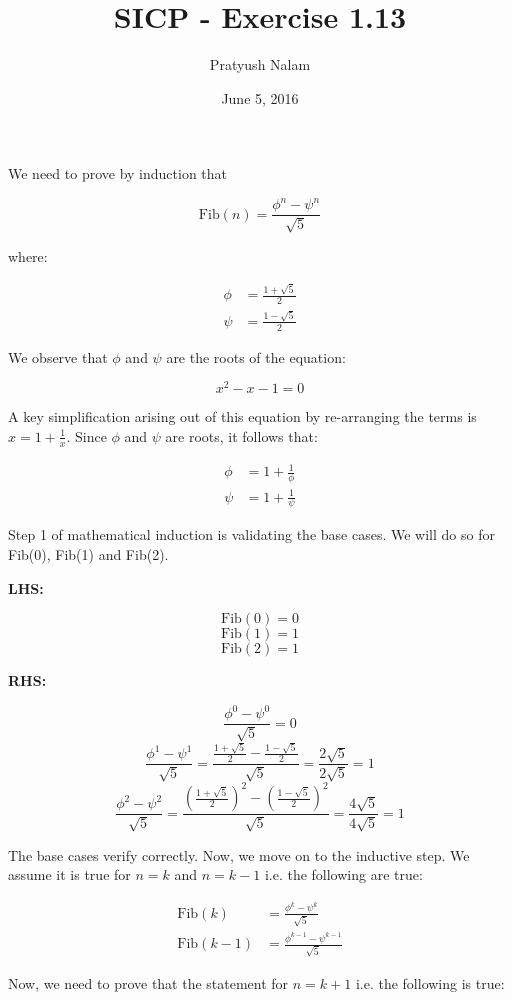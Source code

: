 \documentclass[a4paper]{article}
\title{SICP - Exercise 1.13}
\author{Pratyush Nalam}
\date{June 5, 2016}
\begin{document}
	\maketitle
	
	We need to prove by induction that
	
	\[
	\text{Fib}(n)=\frac{\phi^n-\psi^n}{\sqrt{5}}
	\]
	
	where:
	
	\[
	\begin{split}
	\phi&=\frac{1+\sqrt{5}}{2}\\	
	\psi&=\frac{1-\sqrt{5}}{2}
	\end{split}
	\]
	
	We observe that $\phi$ and $\psi$ are the roots of the equation: 
	
	\[x^2-x-1=0\]
	
	A key simplification arising out of this equation by re-arranging the terms is $x=1+\frac{1}{x}$. Since $\phi$ and $\psi$ are roots, it follows that:
	
	\[
	\begin{split}
	\phi&=1+\frac{1}{\phi}\\	
	\psi&=1+\frac{1}{\psi}
	\end{split}
	\]
	
	Step 1 of mathematical induction is validating the base cases. We will do so for Fib(0), Fib(1) and Fib(2).
	
	\textbf{LHS:}
	
	\[\text{Fib}(0)=0\]
	\[\text{Fib}(1)=1\]
	\[\text{Fib}(2)=1\]
	
	\textbf{RHS:}
	
	\[\frac{\phi^0-\psi^0}{\sqrt{5}}=0\]
	\[\frac{\phi^1-\psi^1}{\sqrt{5}}=\frac{\frac{1+\sqrt{5}}{2}-\frac{1-\sqrt{5}}{2}}{\sqrt{5}}=\frac{2\sqrt{5}}{2\sqrt{5}}=1\]
	\[\frac{\phi^2-\psi^2}{\sqrt{5}}=\frac{\left(\frac{1+\sqrt{5}}{2}\right)^2-\left(\frac{1-\sqrt{5}}{2}\right)^2}{\sqrt{5}}=\frac{4\sqrt{5}}{4\sqrt{5}}=1\]
	
	The base cases verify correctly. Now, we move on to the inductive step. We assume it is true for $n=k$ and $n=k-1$ i.e. the following are true:
	
	\[
	\begin{split}
	\text{Fib}(k)&=\frac{\phi^k-\psi^k}{\sqrt{5}}\\
	\text{Fib}(k-1)&=\frac{\phi^{k-1}-\psi^{k-1}}{\sqrt{5}}
	\end{split}
	\]
	
	Now, we need to prove that the statement for $n=k+1$ i.e. the following is true:
	
\end{document}
